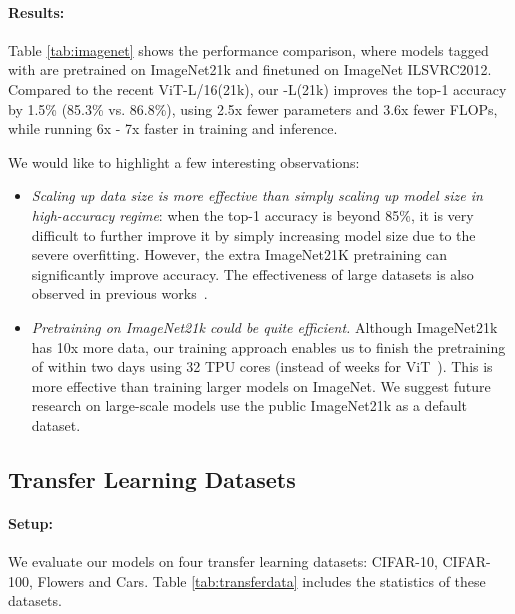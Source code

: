 \documentclass{article}
\begin{document}
\paragraph{Results:}
Table \ref{tab:imagenet} shows the performance comparison, where models tagged with  are pretrained on ImageNet21k and finetuned on ImageNet ILSVRC2012. Compared to the recent ViT-L/16(21k), our {\xnet}-L(21k) improves the top-1 accuracy by 1.5\% (85.3\% vs. 86.8\%), using 2.5x fewer parameters and 3.6x fewer FLOPs, while running 6x - 7x faster in training and inference.

We would like to highlight a few interesting observations:
\begin{itemize}
    \setlength\itemsep{0em}
    \item \emph{Scaling up data size is more effective than simply scaling up model size in high-accuracy regime}: when the top-1 accuracy is beyond 85\%, it is very difficult to further improve it by simply increasing model size due to the severe overfitting. However, the extra ImageNet21K pretraining can  significantly improve accuracy.  The effectiveness of large datasets is also observed in previous works~\cite{imagenetinstagram18,noisystudent20,vit21}. \item \emph{Pretraining on ImageNet21k could be quite efficient.} Although ImageNet21k has 10x more data, our training approach enables us to finish the pretraining of {\xnet} within two days using 32 TPU cores (instead of weeks for ViT~\cite{vit21}). This is more effective than training larger models on ImageNet. 
    We suggest future research on large-scale models use the public ImageNet21k as a default dataset.
\end{itemize}


\subsection{Transfer Learning Datasets}
\paragraph{Setup:} We evaluate our models on four transfer learning datasets: CIFAR-10, CIFAR-100, Flowers and Cars. Table \ref{tab:transferdata} includes the statistics of these datasets.
\end{document}

